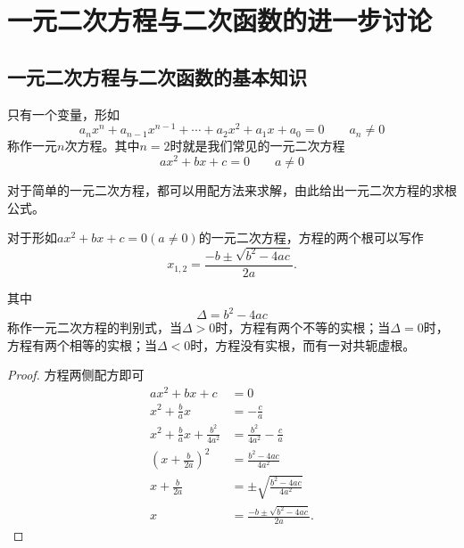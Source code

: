 \section{一元二次方程与二次函数的进一步讨论}
\subsection{一元二次方程与二次函数的基本知识}
\begin{definition}[一元\(n\)次方程]
    只有一个变量，形如
    \begin{equation}
        a_nx^n+a_{n-1}x^{n-1}+\cdots+a_2x^2+a_1x+a_0=0\qquad a_n\neq 0
    \end{equation}
    称作一元\(n\)次方程。其中\(n=2\)时就是我们常见的一元二次方程
    \begin{equation}
        ax^2+bx+c=0\qquad a\neq 0
    \end{equation}
\end{definition}

对于简单的一元二次方程，都可以用配方法来求解，由此给出一元二次方程的求根公式。
\begin{theorem}[一元二次方程的求根公式]
    对于形如\(ax^2+bx+c=0(a\neq0)\)的一元二次方程，方程的两个根可以写作
    \begin{equation}
        x_{1,2}=\frac{-b\pm \sqrt{b^2-4ac}}{2a}.
    \end{equation}

    其中\begin{equation}
        \Delta=b^2-4ac
    \end{equation}
    称作一元二次方程的判别式，当\(\Delta>0\)时，方程有两个不等的实根；当\(\Delta=0\)时，
    方程有两个相等的实根；当\(\Delta<0\)时，方程没有实根，而有一对共轭虚根。
\end{theorem}
\begin{proof}
    方程两侧配方即可
    \begin{align*}
       ax^2+bx+c&=0\\
       x^2+\frac{b}{a}x&=-\frac{c}{a}\\
       x^2+\frac{b}{a}x+\frac{b^2}{4a^2}&=\frac{b^2}{4a^2}-\frac{c}{a}\\
       (x+\frac{b}{2a})^2&=\frac{b^2-4ac}{4a^2}\\
       x+\frac{b}{2a}&=\pm \sqrt{\frac{b^2-4ac}{4a^2}}\\
       x&=\frac{-b\pm \sqrt{b^2-4ac}}{2a}.
    \end{align*}

    
\end{proof}

